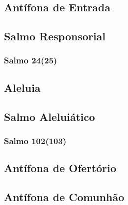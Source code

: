 \subsection{Antífona de Entrada}\label{subsection:tempus-per-annum/sacratissimi-cordis-iesu/introitus}

\AllowPageFlush

\subsection[Salmo Responsorial]{Salmo Responsorial}\label{subsection:tempus-per-annum/sacratissimi-cordis-iesu/psalmus-responsorius}
\subsubsection{Salmo 24(25)}

\AllowPageFlush

\subsection{Aleluia}\label{subsection:tempus-per-annum/sacratissimi-cordis-iesu/alleluia}

\AllowPageFlush

\subsection[Salmo Aleluiático]{Salmo Aleluiático}\label{subsection:tempus-per-annum/sacratissimi-cordis-iesu/psalmus-alleluiaticus}
\subsubsection{Salmo 102(103)}

\AllowPageFlush

\subsection{Antífona de Ofertório}\label{subsection:tempus-per-annum/sacratissimi-cordis-iesu/offertorium}

\AllowPageFlush

\subsection{Antífona de Comunhão}\label{subsection:tempus-per-annum/sacratissimi-cordis-iesu/communio}
